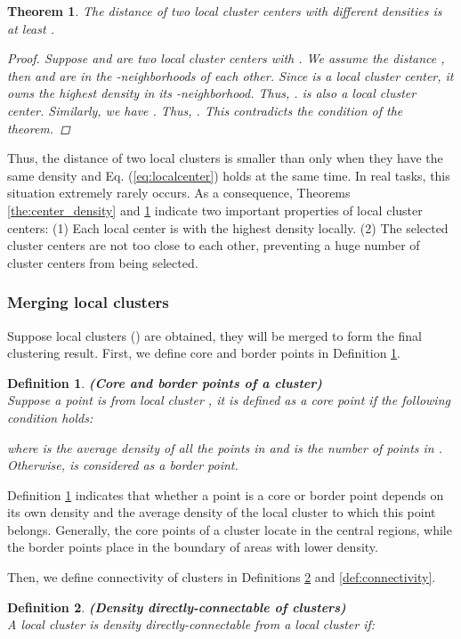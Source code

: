 \documentclass[10pt,twocolumn,letterpaper]{article}
\newtheorem{theorem}{Theorem}
\newtheorem{definition}{Definition}
\begin{document}
\begin{theorem}\label{the:center_distance}
The distance of two local cluster centers with different densities is at least .
\begin{proof}
Suppose  and  are two local cluster centers with . We assume the distance , then  and  are in the -neighborhoods of each other.
Since  is a local cluster center, it owns the highest density in its -neighborhood. Thus, .
 is also a local cluster center. Similarly, we have .
Thus, . This contradicts the condition of the theorem.
\end{proof}
\end{theorem}

Thus, the distance of two local clusters is smaller than  only when they have the same density and Eq. (\ref{eq:localcenter}) holds at the same time. In real tasks, this situation extremely rarely occurs.
As a consequence, Theorems \ref{the:center_density} and \ref{the:center_distance} indicate two important properties of local cluster centers: (1) Each local center is with the highest density locally.  (2) The selected cluster centers are not too close to each other, preventing a huge number of cluster centers from being selected.

\subsubsection{Merging local clusters}
Suppose  local clusters () are obtained, they will be merged to form the final clustering result.
First, we define core and border points in Definition \ref{def:core}.
\begin{definition}\label{def:core}
\textbf{(Core and border points of a cluster)} \\Suppose a point  is from local cluster , it is defined as a core point if the following condition holds:

where  is the average density of all the points in  and  is the number of points in . Otherwise,  is considered as a border point.  
\end{definition}
\noindent Definition \ref{def:core} indicates that whether a point is a core or border point depends on its own density and the average density of the local cluster to which this point belongs.
Generally, the core points of a cluster locate in the central regions, while the border points place in the boundary of areas with lower density.

Then, we define connectivity of clusters in Definitions \ref{def:d-connectivity} and \ref{def:connectivity}.
\begin{definition}\label{def:d-connectivity}
\textbf{(Density directly-connectable of clusters)} \\A local cluster  is density directly-connectable from a local cluster  if:

\end{definition}
\end{document}
